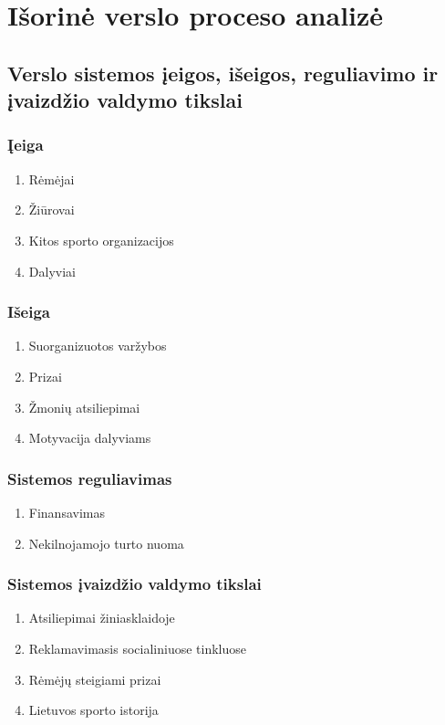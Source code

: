 \documentclass{VUMIFPSkursinis}
\begin{document}
\section{Išorinė verslo proceso analizė} \label{isorineVersloProcesoAnalize}
  \subsection{Verslo sistemos įeigos, išeigos, reguliavimo ir įvaizdžio valdymo tikslai} \label{isorineVersloProcesoAnalize_ieigosIseigosValdymoTikslai}
    \subsubsection*{Įeiga} \label{isorineVersloProcesoAnalize_ieigosIseigosValdymoTikslai_ieiga}
      \begin{enumerate}
        \item Rėmėjai
        \item Žiūrovai
        \item Kitos sporto organizacijos
        \item Dalyviai
      \end{enumerate}
    \subsubsection*{Išeiga} \label{isorineVersloProcesoAnalize_ieigosIseigosValdymoTikslai_iseig}
      \begin{enumerate}
        \item Suorganizuotos varžybos
        \item Prizai
        \item Žmonių atsiliepimai
        \item Motyvacija dalyviams
      \end{enumerate}
    \subsubsection*{Sistemos reguliavimas} \label{isorineVersloProcesoAnalize_ieigosIseigosValdymoTikslai_reguliavimas}
      \begin{enumerate}
        \item Finansavimas
        \item Nekilnojamojo turto nuoma
      \end{enumerate}
    \subsubsection*{Sistemos įvaizdžio valdymo tikslai} \label{isorineVersloProcesoAnalize_ieigosIseigosValdymoTikslai_ivaizdzioValdymoTikslai}
      \begin{enumerate}
        \item Atsiliepimai žiniasklaidoje
        \item Reklamavimasis socialiniuose tinkluose
        \item Rėmėjų steigiami prizai
        \item Lietuvos sporto istorija
      \end{enumerate}
\end{document}
